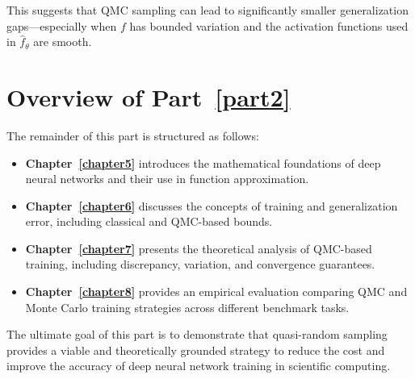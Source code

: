 This suggests that QMC sampling can lead to significantly smaller generalization
gaps—especially when $f$ has bounded variation and the activation functions used
in $\hat{f}_\theta$ are smooth.

\section{Overview of Part~\ref{part2}} The remainder of this part is structured
as follows:
\begin{itemize}
  \item \textbf{Chapter~\ref{chapter5}} introduces the mathematical foundations
  of deep neural networks and their use in function approximation.
  \item \textbf{Chapter~\ref{chapter6}} discusses the concepts of training and
  generalization error, including classical and QMC-based bounds.
  \item \textbf{Chapter~\ref{chapter7}} presents the theoretical analysis of
  QMC-based training, including discrepancy, variation, and convergence
  guarantees.
  \item \textbf{Chapter~\ref{chapter8}} provides an empirical evaluation
  comparing QMC and Monte Carlo training strategies across different benchmark
  tasks.
\end{itemize}

The ultimate goal of this part is to demonstrate that quasi-random sampling
provides a viable and theoretically grounded strategy to reduce the cost and
improve the accuracy of deep neural network training in scientific computing.

